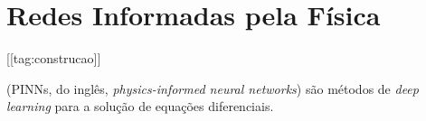 

\chapter{Redes Informadas pela Física}\label{cap_pinns}
\thispagestyle{fancy}
[[tag:construcao]]

 (PINNs, do inglês, \textit{physics-informed neural networks}) são métodos de \textit{deep learning} para a solução de equações diferenciais.





